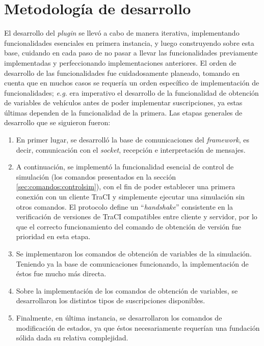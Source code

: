 \section{Metodología de desarrollo} \label{sec:metodologia}

El desarrollo del \emph{plugin} se llevó a cabo de manera iterativa, implementando funcionalidades esenciales en primera instancia, y luego construyendo sobre esta base, cuidando en cada paso de no pasar a llevar las funcionalidades previamente implementadas y perfeccionando implementaciones anteriores. El orden de desarrollo de las funcionalidades fue cuidadosamente planeado, tomando en cuenta que en muchos casos se requería un orden específico de implementación de funcionalidades; \emph{e.g.} era imperativo el desarrollo de la funcionalidad de obtención de variables de vehículos antes de poder implementar suscripciones, ya estas últimas dependen de la funcionalidad de la primera. Las etapas generales de desarrollo que se siguieron fueron:

\begin{enumerate}
    \item En primer lugar, se desarrolló la base de comunicaciones del \emph{framework}, es decir, comunicación con el \emph{socket}, recepción e interpretación de mensajes. 
    
    \item A continuación, se implementó la funcionalidad esencial de control de simulación (los comandos presentados en la sección \ref{sec:comandos:controlsim}), con el fin de poder establecer una primera conexión con un cliente TraCI y simplemente ejecutar una simulación sin otros comandos. 
    El protocolo define un ``\emph{handshake}'' consistente en la verificación de versiones de TraCI compatibles entre cliente y servidor, por lo que el correcto funcionamiento del comando de obtención de versión fue prioridad en esta etapa.
    
    \item Se implementaron los comandos de obtención de variables de la simulación. Teniendo ya la base de comunicaciones funcionando, la implementación de éstos fue mucho más directa.
    
    \item Sobre la implementación de los comandos de obtención de variables, se desarrollaron los distintos tipos de suscripciones disponibles.
    
    \item Finalmente, en última instancia, se desarrollaron los comandos de modificación de estados, ya que éstos necesariamente requerían una fundación sólida dada su relativa complejidad.
\end{enumerate}

